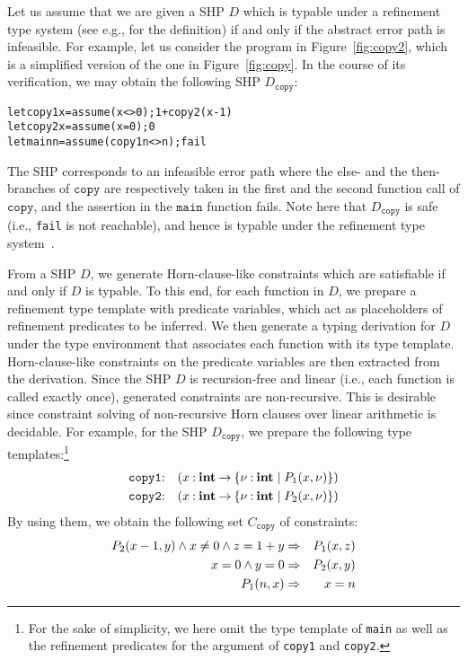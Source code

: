 Let us assume that we are given a SHP \(D\) which is typable under a 
refinement type system (see e.g., \cite{Unno2009} for the definition) if 
and only if the abstract error path is infeasible.  For example, let us 
consider the program in Figure~\ref{fig:copy2}, which is a simplified 
version of the one in Figure~\ref{fig:copy}.  In the course of its 
verification, we may obtain the following SHP \(D_{\texttt{copy}}\):
\begin{alltt}
let copy1 x = assume (x<>0); 1 + copy2 (x-1)
let copy2 x = assume (x=0); 0
let main n = assume (copy1 n <> n); fail
\end{alltt}
The SHP corresponds to an infeasible error path where the else- and the 
then-branches of \(\texttt{copy}\) are respectively taken in the first 
and the second function call of \(\texttt{copy}\), and the assertion in 
the \(\texttt{main}\) function fails.  Note here that 
\(D_{\texttt{copy}}\) is safe (i.e., \texttt{fail} is not reachable), 
and hence is typable under the refinement type system~\cite{Unno2009}.

From a SHP \(D\), we generate Horn-clause-like constraints which are 
satisfiable if and only if \(D\) is typable.  To this end, for each 
function in \(D\), we prepare a refinement type template with predicate 
variables, which act as placeholders of refinement predicates to be 
inferred.  We then generate a typing derivation for \(D\) under the type 
environment that associates each function with its type template. 
Horn-clause-like constraints on the predicate variables are then 
extracted from the derivation.  Since the SHP \(D\) is recursion-free 
and linear (i.e., each function is called exactly once), generated 
constraints are non-recursive.  This is desirable since constraint 
solving of non-recursive Horn clauses over linear arithmetic is 
decidable.  For example, for the SHP \(D_{\texttt{copy}}\), we prepare 
the following type templates:\footnote{For the sake of simplicity, we 
here omit the type template of \texttt{main} as well as the refinement 
predicates for the argument of \texttt{copy1} and \texttt{copy2}.}
\begin{eqnarray*}
\texttt{copy1}&\mathbin{:}&(x\mathbin{:}{\mathbf{int}}\mathbin{\rightarrow}{\{{\nu\mathbin{:}\mathbf{int} \mid P_1(x,\nu)}\}}) \\
\texttt{copy2}&\mathbin{:}&(x\mathbin{:}{\mathbf{int}}\mathbin{\rightarrow}{\{{\nu\mathbin{:}\mathbf{int} \mid P_2(x,\nu)}\}})
\end{eqnarray*}
By using them, we obtain the following set \(C_{\texttt{copy}}\) of
constraints:
\begin{eqnarray*}
P_2(x-1,y) \land x\neq0 \land z=1+y &\Rightarrow& P_1(x,z) \\
x=0 \land y=0 &\Rightarrow& P_2(x,y) \\
P_1(n,x) &\Rightarrow& x=n
\end{eqnarray*}

